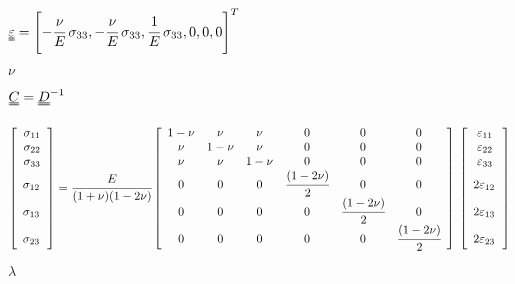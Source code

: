 \documentclass[onecolumn,11pt]{report}
\def\lthtmlcheckvsize{\ifdim\ht\sizebox<\vsize 
  \ifdim\wd\sizebox<\hsize\expandafter\hfill\fi \expandafter\vfill
  \else\expandafter\vss\fi}%
\begin{document}
{\newpage\clearpage
{}%
$\displaystyle \uuline{\varepsilon} = \left [ -\cfrac{\nu}{E} \: \sigma_{33},-\cfrac{\nu}{E} \: \sigma_{33},\cfrac{1}{E} \: \sigma_{33},0,0,0 \right]^T $%
\lthtmlindisplaymathZ
\lthtmlcheckvsize\clearpage}

{\newpage\clearpage
{}%
$ \nu$%
\lthtmlindisplaymathZ
\lthtmlcheckvsize\clearpage}

{\newpage\clearpage
{}%
$ \uuline{C} = \uuline{D}^{-1}$%
\lthtmlindisplaymathZ
\lthtmlcheckvsize\clearpage}

{\newpage\clearpage
{}%
\begin{displaymath}%
	\left[
\begin{array} {c}
\sigma_{11} \\
\sigma_{22} \\
\sigma_{33} \\
\sigma_{12} \cfrac{}{} \\
\sigma_{13} \cfrac{}{} \\
\sigma_{23} \cfrac{}{}
\end{array}
\right]
= \cfrac{E}{(1+\nu)(1-2\nu)}
\left[
\begin{array}{cccccc}
1-\nu & \nu & \nu & 0 & 0 & 0\\
\nu & 1-\nu & \nu & 0 & 0 & 0\\
\nu & \nu & 1-\nu & 0 & 0 & 0\\
0 & 0 & 0 & \cfrac{(1-2\nu)}{2} & 0 & 0 \\
0 & 0 & 0 & 0 & \cfrac{(1-2\nu)}{2} & 0 \\
0 & 0 & 0 & 0 & 0 & \cfrac{(1-2\nu)}{2}
\end{array}
\right]
\:
\left[
\begin{array} {c}
\varepsilon_{11} \\
\varepsilon_{22} \\
\varepsilon_{33} \\
2 \varepsilon_{12} \cfrac{}{} \\
2 \varepsilon_{13}  \cfrac{}{}\\
2 \varepsilon_{23} \cfrac{}{}
\end{array}
\right]\end{displaymath}%
\lthtmldisplayZ
\lthtmlcheckvsize\clearpage}

{\newpage\clearpage
{}%
$ \lambda$%
\lthtmlindisplaymathZ
\lthtmlcheckvsize\clearpage}
\end{document}
